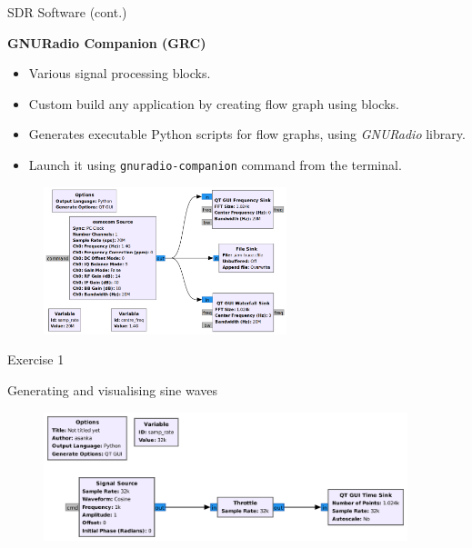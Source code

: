 \documentclass[handout]{beamer}
\begin{document}
\begin{frame}{SDR Software (cont.)}  

\footnotesize
\textbf{GNURadio Companion (GRC)}

	\begin{itemize}
	\footnotesize
	\item Various signal processing blocks.
		\vspace{5pt}
	\item Custom build any application by creating flow graph using blocks.
		\vspace{5pt}
	\item Generates executable Python scripts for flow graphs, using \emph{GNURadio} library.
		\vspace{5pt}
	\item Launch it using \texttt{gnuradio-companion} command from the terminal.
	\end{itemize}

	\begin{figure}
		\includegraphics[width=200pt]{figures/grc-flowgraph-for-data-acquisition.png}
	\end{figure}

\end{frame}


\begin{frame}{Exercise 1}  

\footnotesize
Generating and visualising sine waves

	\begin{figure}
		\includegraphics[width=300pt]{figures/Example-1.pdf}
	\end{figure}

\end{frame}
\end{document}
